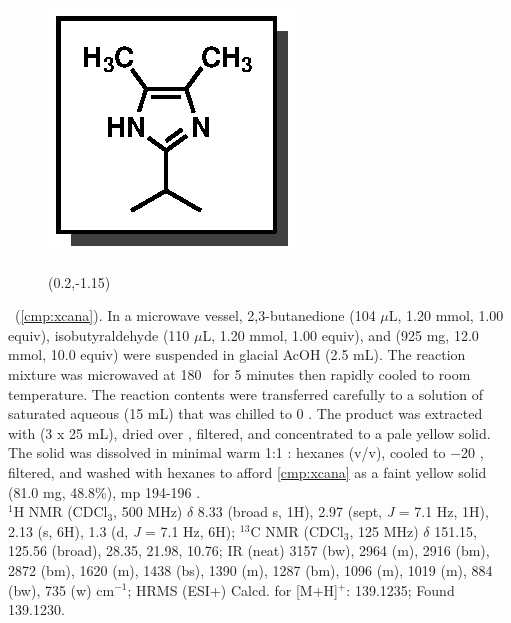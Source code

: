 \vspace{10pt}
\begin{figure}
  \vspace{-25pt}
  \begin{center}
    \includegraphics[scale=0.8]{chp_alkylation/images/xcana}
     \begin{textblock}{1}(0.2,-1.15)  \end{textblock}
  \end{center}
  \vspace{-30pt}
\end{figure}
\noindent \textbf{\CMPxcana}\ (\ref{cmp:xcana}). In a microwave vessel, 2,3-butanedione (104 $\mu$L, 1.20 mmol, 1.00 equiv), isobutyraldehyde (110
$\mu$L, 1.20 mmol, 1.00 equiv), and  (925 mg, 12.0
mmol, 10.0 equiv) were suspended in glacial AcOH (2.5 mL). The reaction
mixture was microwaved at 180 \degc\ for 5 minutes then rapidly cooled to room temperature. The
reaction contents were transferred carefully to a solution of saturated aqueous  (15 mL)
that was chilled to 0 \degc. The product was extracted with  (3 x 25 mL), dried over
, filtered, and concentrated to a pale yellow solid. The solid was dissolved in minimal
warm 1:1 : hexanes (v/v), cooled to $-$20 \degc, filtered, and washed with hexanes to
afford \ref{cmp:xcana} as a faint yellow solid (81.0 mg, 48.8\%), mp 194-196 \degc.
\\
$^1$H NMR (CDCl$_3$, 500 MHz) $\delta$ 8.33 (broad s, 1H), 2.97 (sept, \textit{J} = 7.1 Hz, 1H),
2.13 (s, 6H), 1.3 (d, \textit{J} = 7.1 Hz, 6H); $^{13}$C NMR (CDCl$_3$, 125 MHz) $\delta$ 151.15,
125.56 (broad), 28.35, 21.98, 10.76; IR (neat) 3157 (bw), 2964 (m), 2916 (bm), 2872 (bm), 1620 (m),
1438 (bs), 1390 (m), 1287 (bm), 1096 (m), 1019 (m), 884 (bw), 735 (w) cm$^{-1}$; HRMS (ESI+) Calcd.
for  [M+H]$^+$:
139.1235; Found 139.1230.

